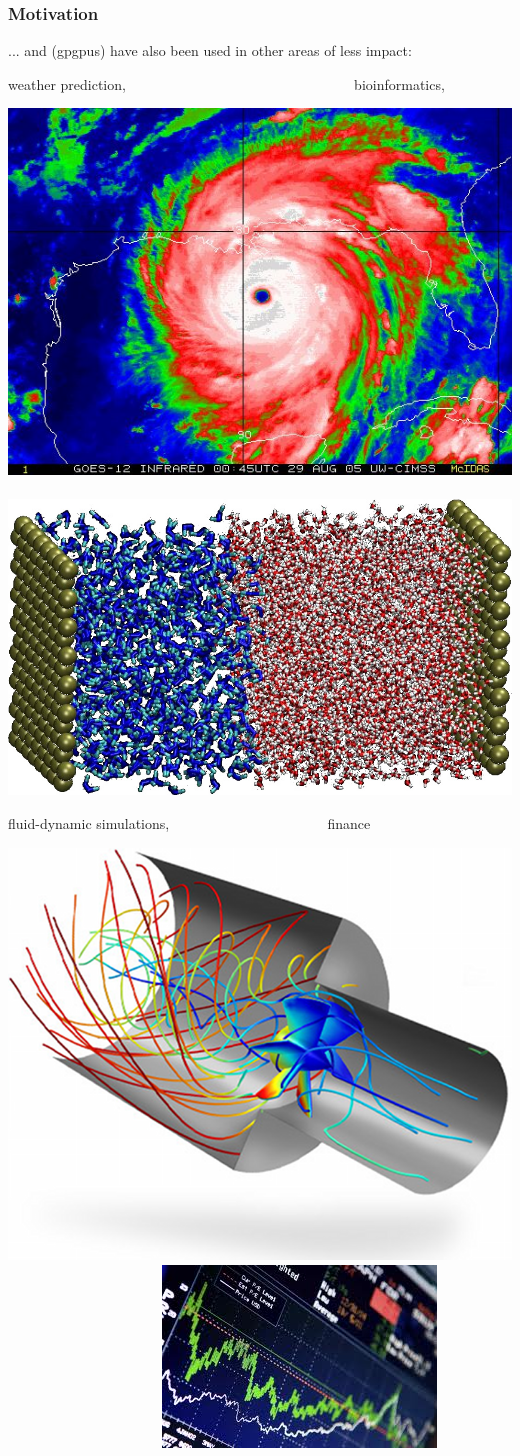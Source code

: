 \documentclass{beamer}
\begin{document}
\begin{frame}
  \frametitle{Motivation}
\bigskip
... and ({\sc gpgpu}s) have also been used in other areas of less impact: \bigskip 

weather prediction, 
$\mbox{ }\mbox{ }\mbox{ }\mbox{ }\mbox{ }\mbox{ }\mbox{ }\mbox{ }\mbox{ }\mbox{ }\mbox{ }\mbox{ }\mbox{ }\mbox{ }\mbox{ }\mbox{ }$ 
$\mbox{ }\mbox{ }\mbox{ }\mbox{ }\mbox{ }\mbox{ }\mbox{ }$
bioinformatics,

\begin{center} 
\includegraphics[height=15ex]{ParTeaserFigs/meteo}  
$\mbox{ }\mbox{ }\mbox{ }\mbox{ }\mbox{ }\mbox{ }\mbox{ }\mbox{ }\mbox{ }\mbox{ }\mbox{ }\mbox{ }\mbox{ }\mbox{ }\mbox{ }\mbox{ }$ 
\includegraphics[height=15ex]{ParTeaserFigs/molecular_sim.jpg}  
\end{center} 
\smallskip

fluid-dynamic simulations,
$\mbox{ }\mbox{ }\mbox{ }\mbox{ }\mbox{ }\mbox{ }\mbox{ }\mbox{ }\mbox{ }\mbox{ }\mbox{ }\mbox{ }\mbox{ }\mbox{ }\mbox{ }\mbox{ }$ 
finance

\begin{center} 
\includegraphics[height=15ex]{ParTeaserFigs/fluid_dyn_sim.png}  
$\mbox{ }\mbox{ }\mbox{ }\mbox{ }\mbox{ }\mbox{ }\mbox{ }\mbox{ }\mbox{ }\mbox{ }\mbox{ }\mbox{ }\mbox{ }\mbox{ }\mbox{ }\mbox{ }$ 
\includegraphics[height=15ex]{ParTeaserFigs/finance.jpeg} 
\end{center}
\end{frame}
\end{document}
